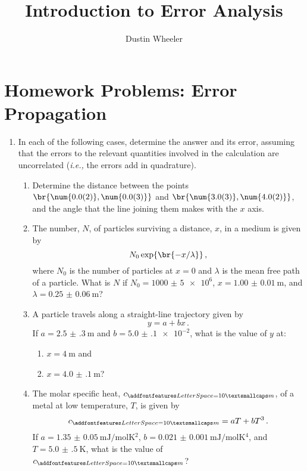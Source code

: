 \documentclass[nobib,nofonts,nols,nohyper]{tufte-handout}
\title{Introduction to Error Analysis}
\author{Dustin Wheeler}
\begin{document}
\maketitle

\section{Homework Problems: Error Propagation} %
\label{sec:homework_problems_error_propagation}

\begin{enumerate}
	\item In each of the following cases, determine the answer and its error, assuming that the errors to the relevant quantities involved in the calculation are uncorrelated (\emph{i.e.,} the errors add in quadrature).
	\begin{enumerate}
		\item Determine the distance between the points \( \br{\num{0.0(2)}, \num{0.0(3)}} \) and \( \br{\num{3.0(3)}, \num{4.0(2)}} \), and the angle that the line joining them makes with the \( x \) axis. 
		\item The number, \( N \), of particles surviving a distance, \( x \), in a medium is given by \[ 
		N_0 \exp\br{-x/\lambda} \, ,
		\] 
		where \( N_0 \) is the number of particles at \( x = 0 \) and \( \lambda \) is the mean free path of a particle. 
		What is \( N \) if \( N_0=\num{1000(5)e6} \), \( x = \SI{1.00(1)}{\m} \), and \( \lambda = \SI{0.25(6)}{\m} \)?
		
		\item A particle travels along a straight-line trajectory given by \[
		 y = a + bx \, .
		 \] 
		If \( a = \SI{2.5(3)}{\m} \) and \( b = \num{5.0(1)e-2} \), what is the value of \( y \) at:
		\begin{enumerate}
			\item \( x = \SI{4}{\m} \) and
			
			\item \( x = \SI{4.0(1)}{\m} \)?
		\end{enumerate}
		
		\item The molar specific heat, \( c_{\textsc{m}} \), of a metal at low temperature, \( T \), is given by \[
			c_{\textsc{m}} = a T + b T^3 \, .
		\]
		If \( a = \SI{1.35(5)}{\mJ\per\mol\K^2} \), \( b = \SI{0.021(1)}{\mJ\per\mol\K^4} \), and \( T = \SI{5.0(5)}{\K} \), what is the value of \( c_{\textsc{m}} \)?
	\end{enumerate}
	

\end{enumerate}
\end{document}
